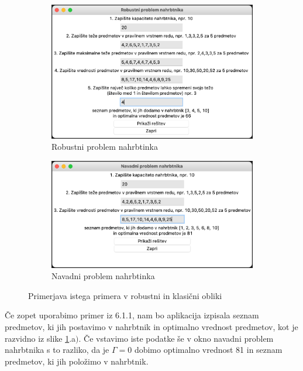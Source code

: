 \documentclass[a4paper,12pt]{article}
\theoremstyle{definition}
\begin{document}
\begin{figure}[h!!]
    \centering
    \begin{subfigure}[b]{0.8\linewidth}
      \includegraphics[width=\linewidth]{graficni_prikaz_RKP.png}
      \caption{Robustni problem nahrbtinka}
      \smallskip
    \end{subfigure}
    \begin{subfigure}[b]{0.8\linewidth}
      \includegraphics[width=\linewidth]{graficni_prikaz_KP.png}
      \caption{Navadni problem nahrbtinka}
    \end{subfigure}
    \caption{Primerjava istega primera v robustni in klasični obliki}
    \label{fig:koda2}
  \end{figure}

\noindent Če zopet uporabimo primer iz 6.1.1, nam bo aplikacija izpisala seznam predmetov, ki jih 
postavimo v nahrbtnik in optimalno vrednost predmetov, kot je razvidno iz slike \ref{fig:koda2}.a$)$. Če vstavimo 
iste podatke še v okno navadni problem nahrbtnika s to razliko, da je $\Gamma = 0$ dobimo optimalno vrednost 81 in 
seznam predmetov, ki jih položimo v nahrbtnik.
\end{document}
